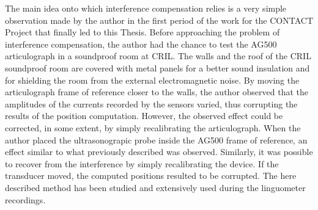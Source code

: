 
The main idea onto which interference compensation relies is a very simple
observation made by the author in the first period of the work for the CONTACT
Project that finally led to this Thesis.
Before approaching the problem of interference compensation, the author had the
chance to test the AG500 articulograph in a soundproof room at CRIL.
The walls and the roof of the CRIL soundproof room are covered with metal 
panels for a better sound insulation and for shielding the room from the
external electromagnetic noise.
By moving the articulograph frame of reference closer to the walls, the author
observed that the amplitudes of the currents recorded by the sensors varied, 
thus corrupting the results of the position computation.
However, the observed effect could be corrected, in some extent, by simply 
recalibrating the articulograph.
When the author placed the ultrasonograpic probe inside the AG500 frame of
reference, an effect similar to what previously described was observed.
Similarly, it was possible to recover from the interference by simply
recalibrating the device.
If the transducer moved, the computed positions resulted to be corrupted.
The here described method has been studied and extensively used during the
linguometer recordings.\\


